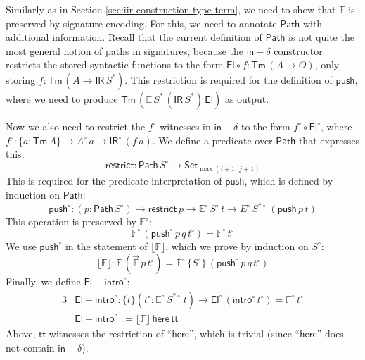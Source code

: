 \documentclass[acmsmall,screen,review,anonymous]{acmart}
\newcommand{\msf}[1]{{\mathsf{#1}}}
\newcommand{\mbb}[1]{\mathbb{#1}}
\newcommand{\push}{\mathsf{push}}
\newcommand{\Set}{\msf{Set}}
\newcommand{\El}{\msf{El}}
\newcommand{\ttt}{\msf{tt}}
\newcommand{\IR}{\msf{IR}}
\newcommand{\intro}{\msf{intro}}
\newcommand{\floord}[1]{\lfloor #1 \rfloor}
\newcommand{\ora}[1]{\overrightarrow{#1}}
\newcommand{\Tm}{\msf{Tm}}
\newcommand{\w}{\circ}
\newcommand{\Path}{\msf{Path}}
\newcommand{\here}{\msf{here}}
\newcommand{\indelta}{\msf{in}\!\!-\!\!\delta}
\newcommand{\Elintro}{\msf{El\!\!-\!\!intro}}
\newcommand{\E}{\mbb{E}}
\newcommand{\F}{\mbb{F}}
\begin{document}
\begin{definition}[Interpretation of $\Elintro$]\label{sec:canonicity-elintro}
Similarly as in Section \ref{sec:iir-construction-type-term}, we need to show that $\F$ is preserved
by signature encoding. For this, we need to annotate $\Path$ with additional information. Recall
that the current definition of $\Path$ is not quite the most general notion of paths in signatures,
because the $\indelta$ constructor restricts the stored syntactic functions to the form $\El \circ f
: \Tm\,(A \to O)$, only storing $f : \Tm\,(A \to \IR\,S^*)$. This restriction is required for the
definition of $\push$, where we need to produce $\Tm\,(\E\,S^*\,(\IR\,S^*)\,\El)$ as output.

Now we also need to restrict the $f^\w$ witnesses in $\indelta$ to the form $f^\w \circ \El^\w$,
where $f^\w : \{a : \Tm\,A\} \to A^\w\,a \to \IR^\w\,(f\,a)$. We define a predicate over $\Path$
that expresses this:
\[ \msf{restrict} : \Path\,S^\w \to \Set_{\max(i+1,\,j+1)} \]
This is required for the predicate interpretation of $\push$, which is defined by induction on $\Path$:
\[ \push^\w : (p : \Path\,S^\w) \to \msf{restrict}\,p \to \E^\w\,S^\w\,t \to E^\w\,S^{*\w}\,(\push\,p\,t) \]
This operation is preserved by $\F^\w$:
\[ \F^\w\,(\push^\w\,p\,q\,t^\w) = \F^\w\,t^\w \]
We use $\push^\w$ in the statement of $\floord{\F}$, which we prove by induction on
$S^\w$:
\[ \floord{\F} : \F\,(\ora{\E}\,p\,t^\w) = \F^\w\,\{S^\w\}\,(\push^\w\,p\,q\,t^\w) \]
Finally, we define $\Elintro^\w$:
\begin{alignat*}{3}
    &\Elintro^\w : \{t\}(t^\w : \E^\w\,S^{*\w}\,t) \to \El^\w\,(\intro^\w\,t^\w) = \F^\w\,t^\w\\
    &\Elintro^\w\ := \floord{\F}\,\here\,\ttt
\end{alignat*}
Above, $\ttt$ witnesses the restriction of ``$\here$'', which is trivial (since ``$\here$'' does not contain $\indelta$).
\end{definition}
\end{document}

